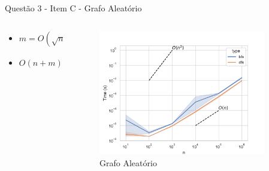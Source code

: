 \documentclass[aspectratio=169,usenames,dvipsnames]{beamer}
\begin{document}
\begin{frame}{ Questão 3 - Item C - Grafo Aleatório }
  \begin{columns}
    \begin{column}{0.5\textwidth}
      \begin{itemize}
        \item $m = O(\sqrt{n})$
        \item $ O(n + m) = O(n + \sqrt{n}) = O(n) $
      \end{itemize}
    \end{column}
    \begin{column}{0.5\textwidth}
      \begin{figure}
        \includegraphics[width=0.9\textwidth]{figs/time_sqrt_graph.pdf}
        \caption{Grafo Aleatório}
      \end{figure}
    \end{column}
  \end{columns}
\end{frame}
\end{document}
